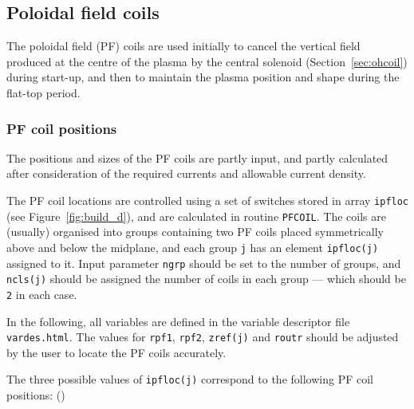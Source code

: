 \documentclass[11pt,a4paper]{report}
\begin{document}
\subsection{Poloidal field coils}
\label{sec:pfcoils}

The poloidal field (PF) coils are used initially to cancel the vertical field
produced at the centre of the plasma by the central solenoid (Section~\ref{sec:ohcoil})
during start-up, and then to maintain the plasma position and shape during the
flat-top period.

\subsubsection{PF coil positions}

The positions and sizes of the PF coils are partly input, and partly
calculated after consideration of the required currents and allowable current
density.

The PF coil locations are controlled using a set of switches stored in array
\texttt{ipfloc} (see Figure~\ref{fig:build_d}), and are calculated in routine
\texttt{PFCOIL}. The coils are (usually) organised into groups containing two
PF coils placed symmetrically above and below the midplane, and each group
\texttt{j} has an element \texttt{ipfloc(j)} assigned to it. Input parameter
\texttt{ngrp} should be set to the number of groups, and \texttt{ncls(j)}
should be assigned the number of coils in each group --- which should be
\texttt{2} in each case.

In the following, all variables are defined in the variable descriptor file
\texttt{vardes.html}. The values for \texttt{rpf1}, \texttt{rpf2},
\texttt{zref(j)} and \texttt{routr} should be adjusted by the user to locate
the PF coils accurately.

The three possible values of \texttt{ipfloc(j)} correspond to the following PF
coil positions: ()
\end{document}
